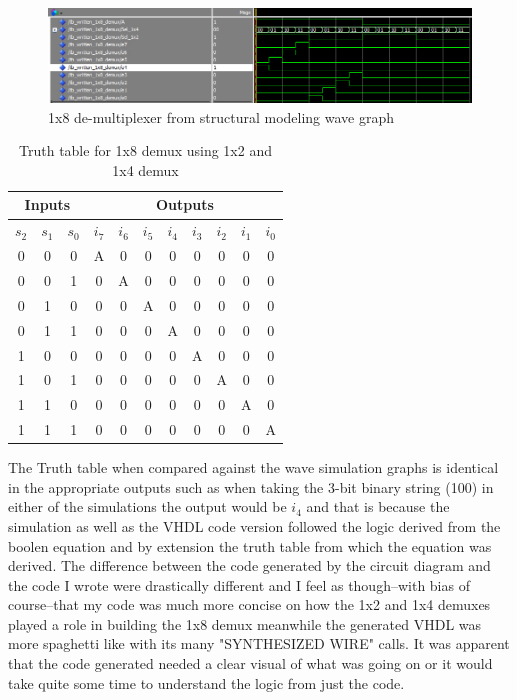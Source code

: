\documentclass[12pt]{article}
\begin{document}
\begin{figure}[h]
\caption{1x8 de-multiplexer from structural modeling wave graph}
\includegraphics[width=\textwidth]{./diagrams/written_1x8_demux_simulation.png}
\end{figure}

\begin{table}[h]
    \begin{tabular}{|c|c|c||c|c|c|c|c|c|c|c|}
        \hline
        \multicolumn{3}{|c||}{Inputs} & \multicolumn{8}{c|}{Outputs} \\
        \hline
        \( s_2 \) & \( s_1 \) & \( s_0 \) & \( i_7 \) & \( i_6 \) & \( i_5 \) & \( i_4 \) & \( i_3 \) & \( i_2 \) & \( i_1 \) & \( i_0 \) \\
        \hline
        0 & 0 & 0 & A & 0 & 0 & 0 & 0 & 0 & 0 & 0 \\
        \hline
        0 & 0 & 1 & 0 & A & 0 & 0 & 0 & 0 & 0 & 0 \\
        \hline
        0 & 1 & 0  & 0 & 0 & A & 0 & 0 & 0 & 0 & 0 \\
        \hline
        0 & 1 & 1  & 0 & 0 & 0 & A & 0 & 0 & 0 & 0 \\
        \hline
        1 & 0 & 0  & 0 & 0 & 0 & 0 & A & 0 & 0 & 0 \\
        \hline
        1 & 0 & 1  & 0 & 0 & 0 & 0 & 0 & A & 0 & 0 \\
        \hline
        1 & 1 & 0  & 0 & 0 & 0 & 0 & 0 & 0 & A & 0 \\
        \hline
        1 & 1 & 1  & 0 & 0 & 0 & 0 & 0 & 0 & 0 & A \\
        \hline
    \end{tabular}
    \caption{Truth table for 1x8 demux using 1x2 and 1x4 demux}
\end{table}

The Truth table when compared against the wave simulation graphs is identical in the appropriate outputs such as when taking the 3-bit binary string (100) in either of the simulations the output would be $i_4$ and that is because the simulation as well as the VHDL code version followed the logic derived from the boolen equation and by extension the truth table from which the equation was derived. The difference between the code generated by the circuit diagram and the code I wrote were drastically different and I feel as though--with bias of course--that my code was much more concise on how the 1x2 and 1x4 demuxes played a role in building the 1x8 demux meanwhile the generated VHDL was more spaghetti like with its many "SYNTHESIZED WIRE" calls. It was apparent that the code generated needed a clear visual of what was going on or it would take quite some time to understand the logic from just the code.
\end{document}
